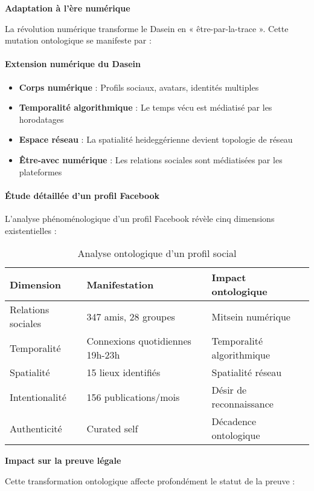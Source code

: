 \documentclass[12pt,a4paper]{article}
\begin{document}
\textbf{Adaptation à l'ère numérique}

La révolution numérique transforme le Dasein en « être-par-la-trace ». Cette mutation ontologique se manifeste par :

\paragraph{Extension numérique du Dasein}
\begin{itemize}
\item \textbf{Corps numérique} : Profils sociaux, avatars, identités multiples
\item \textbf{Temporalité algorithmique} : Le temps vécu est médiatisé par les horodatages
\item \textbf{Espace réseau} : La spatialité heideggérienne devient topologie de réseau
\item \textbf{Être-avec numérique} : Les relations sociales sont médiatisées par les plateformes
\end{itemize}

\paragraph{Étude détaillée d'un profil Facebook}

L'analyse phénoménologique d'un profil Facebook révèle cinq dimensions existentielles :

\begin{table}[H]
\centering
\begin{tabular}{|l|l|l|}
\hline
\textbf{Dimension} & \textbf{Manifestation} & \textbf{Impact ontologique} \\
\hline
Relations sociales & 347 amis, 28 groupes & Mitsein numérique \\
\hline
Temporalité & Connexions quotidiennes 19h-23h & Temporalité algorithmique \\
\hline
Spatialité & 15 lieux identifiés & Spatialité réseau \\
\hline
Intentionalité & 156 publications/mois & Désir de reconnaissance \\
\hline
Authenticité & Curated self & Décadence ontologique \\
\hline
\end{tabular}
\caption{Analyse ontologique d'un profil social}
\end{table}

\textbf{Impact sur la preuve légale}

Cette transformation ontologique affecte profondément le statut de la preuve :
\end{document}
